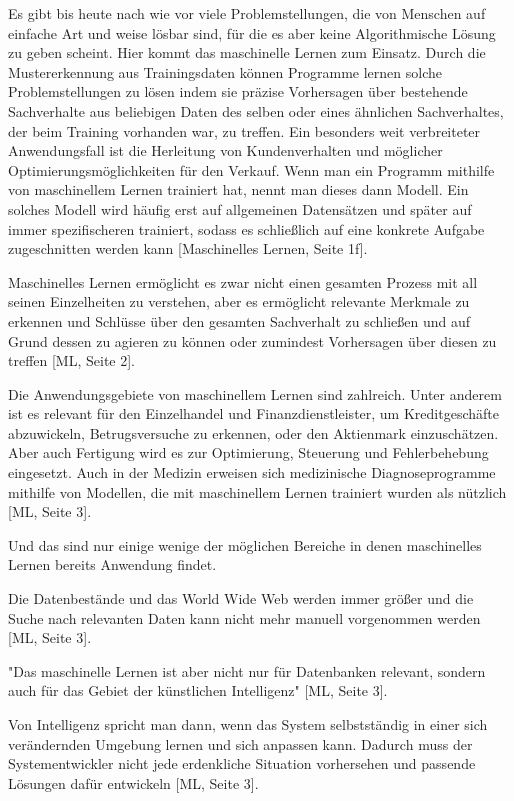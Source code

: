 Es gibt bis heute nach wie vor viele Problemstellungen, die von Menschen auf einfache Art und weise lösbar sind, für die es aber keine Algorithmische Lösung zu geben scheint. Hier kommt das maschinelle Lernen zum Einsatz. Durch die Mustererkennung aus Trainingsdaten können Programme lernen solche Problemstellungen zu lösen indem sie präzise Vorhersagen über bestehende Sachverhalte aus beliebigen Daten des selben oder eines ähnlichen Sachverhaltes, der beim Training vorhanden war, zu treffen. Ein besonders weit verbreiteter Anwendungsfall ist die Herleitung von Kundenverhalten und möglicher Optimierungsmöglichkeiten für den Verkauf. Wenn man ein Programm mithilfe von maschinellem Lernen trainiert hat, nennt man dieses dann Modell. Ein solches Modell wird häufig erst auf allgemeinen Datensätzen und später auf immer spezifischeren trainiert, sodass es schließlich auf eine konkrete Aufgabe zugeschnitten werden kann [Maschinelles Lernen, Seite 1f].

Maschinelles Lernen ermöglicht es zwar nicht einen gesamten Prozess mit all seinen Einzelheiten zu verstehen, aber es ermöglicht relevante Merkmale zu erkennen und Schlüsse über den gesamten Sachverhalt zu schließen und auf Grund dessen zu agieren zu können oder zumindest Vorhersagen über diesen zu treffen [ML, Seite 2].

Die Anwendungsgebiete von maschinellem Lernen sind zahlreich. Unter anderem ist es relevant für den Einzelhandel und Finanzdienstleister, um Kreditgeschäfte abzuwickeln, Betrugsversuche zu erkennen, oder den Aktienmark einzuschätzen. Aber auch Fertigung wird es zur Optimierung, Steuerung und Fehlerbehebung eingesetzt. Auch in der Medizin erweisen sich medizinische Diagnoseprogramme mithilfe von Modellen, die mit maschinellem Lernen trainiert wurden als nützlich [ML, Seite 3].

 Und das sind nur einige wenige der möglichen Bereiche in denen maschinelles Lernen bereits Anwendung findet. 
 
 Die Datenbestände und das World Wide Web werden immer größer und die Suche nach relevanten Daten kann nicht mehr manuell vorgenommen werden [ML, Seite 3].
 
 "Das maschinelle Lernen ist aber nicht nur für Datenbanken relevant, sondern auch für das Gebiet der künstlichen Intelligenz" [ML, Seite 3].
 
 Von Intelligenz spricht man dann, wenn das System selbstständig in einer sich verändernden Umgebung lernen und sich anpassen kann. Dadurch muss der Systementwickler nicht jede erdenkliche Situation vorhersehen und passende Lösungen dafür entwickeln [ML, Seite 3].
 
